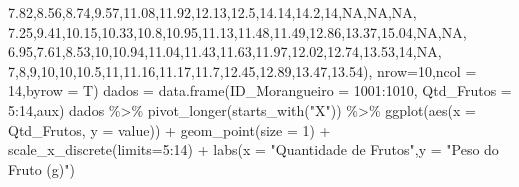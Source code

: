 \documentclass[
]{book}
\newenvironment{Shaded}{\begin{snugshade}}{\end{snugshade}}
\newcommand{\AttributeTok}[1]{\textcolor[rgb]{0.77,0.63,0.00}{#1}}
\newcommand{\ConstantTok}[1]{\textcolor[rgb]{0.00,0.00,0.00}{#1}}
\newcommand{\DecValTok}[1]{\textcolor[rgb]{0.00,0.00,0.81}{#1}}
\newcommand{\FloatTok}[1]{\textcolor[rgb]{0.00,0.00,0.81}{#1}}
\newcommand{\FunctionTok}[1]{\textcolor[rgb]{0.00,0.00,0.00}{#1}}
\newcommand{\NormalTok}[1]{#1}
\newcommand{\OtherTok}[1]{\textcolor[rgb]{0.56,0.35,0.01}{#1}}
\newcommand{\SpecialCharTok}[1]{\textcolor[rgb]{0.00,0.00,0.00}{#1}}
\newcommand{\StringTok}[1]{\textcolor[rgb]{0.31,0.60,0.02}{#1}}
\begin{document}
\begin{Shaded}
\begin{Highlighting}[]
               \FloatTok{7.82}\NormalTok{,}\FloatTok{8.56}\NormalTok{,}\FloatTok{8.74}\NormalTok{,}\FloatTok{9.57}\NormalTok{,}\FloatTok{11.08}\NormalTok{,}\FloatTok{11.92}\NormalTok{,}\FloatTok{12.13}\NormalTok{,}\FloatTok{12.5}\NormalTok{,}\FloatTok{14.14}\NormalTok{,}\FloatTok{14.2}\NormalTok{,}\DecValTok{14}\NormalTok{,}\ConstantTok{NA}\NormalTok{,}\ConstantTok{NA}\NormalTok{,}\ConstantTok{NA}\NormalTok{,}
               \FloatTok{7.25}\NormalTok{,}\FloatTok{9.41}\NormalTok{,}\FloatTok{10.15}\NormalTok{,}\FloatTok{10.33}\NormalTok{,}\FloatTok{10.8}\NormalTok{,}\FloatTok{10.95}\NormalTok{,}\FloatTok{11.13}\NormalTok{,}\FloatTok{11.48}\NormalTok{,}\FloatTok{11.49}\NormalTok{,}\FloatTok{12.86}\NormalTok{,}\FloatTok{13.37}\NormalTok{,}\FloatTok{15.04}\NormalTok{,}\ConstantTok{NA}\NormalTok{,}\ConstantTok{NA}\NormalTok{,}
               \FloatTok{6.95}\NormalTok{,}\FloatTok{7.61}\NormalTok{,}\FloatTok{8.53}\NormalTok{,}\DecValTok{10}\NormalTok{,}\FloatTok{10.94}\NormalTok{,}\FloatTok{11.04}\NormalTok{,}\FloatTok{11.43}\NormalTok{,}\FloatTok{11.63}\NormalTok{,}\FloatTok{11.97}\NormalTok{,}\FloatTok{12.02}\NormalTok{,}\FloatTok{12.74}\NormalTok{,}\FloatTok{13.53}\NormalTok{,}\DecValTok{14}\NormalTok{,}\ConstantTok{NA}\NormalTok{,}
               \DecValTok{7}\NormalTok{,}\DecValTok{8}\NormalTok{,}\DecValTok{9}\NormalTok{,}\DecValTok{10}\NormalTok{,}\DecValTok{10}\NormalTok{,}\FloatTok{10.5}\NormalTok{,}\DecValTok{11}\NormalTok{,}\FloatTok{11.16}\NormalTok{,}\FloatTok{11.17}\NormalTok{,}\FloatTok{11.7}\NormalTok{,}\FloatTok{12.45}\NormalTok{,}\FloatTok{12.89}\NormalTok{,}\FloatTok{13.47}\NormalTok{,}\FloatTok{13.54}\NormalTok{),}
             \AttributeTok{nrow=}\DecValTok{10}\NormalTok{,}\AttributeTok{ncol =} \DecValTok{14}\NormalTok{,}\AttributeTok{byrow =}\NormalTok{ T)}
\NormalTok{dados }\OtherTok{=} \FunctionTok{data.frame}\NormalTok{(}\AttributeTok{ID\_Morangueiro =} \DecValTok{1001}\SpecialCharTok{:}\DecValTok{1010}\NormalTok{,}
                   \AttributeTok{Qtd\_Frutos =} \DecValTok{5}\SpecialCharTok{:}\DecValTok{14}\NormalTok{,aux)}
\NormalTok{dados }\SpecialCharTok{\%\textgreater{}\%} 
  \FunctionTok{pivot\_longer}\NormalTok{(}\FunctionTok{starts\_with}\NormalTok{(}\StringTok{"X"}\NormalTok{)) }\SpecialCharTok{\%\textgreater{}\%} 
  \FunctionTok{ggplot}\NormalTok{(}\FunctionTok{aes}\NormalTok{(}\AttributeTok{x =}\NormalTok{ Qtd\_Frutos, }\AttributeTok{y =}\NormalTok{ value)) }\SpecialCharTok{+}
  \FunctionTok{geom\_point}\NormalTok{(}\AttributeTok{size =} \DecValTok{1}\NormalTok{) }\SpecialCharTok{+}
  \FunctionTok{scale\_x\_discrete}\NormalTok{(}\AttributeTok{limits=}\DecValTok{5}\SpecialCharTok{:}\DecValTok{14}\NormalTok{) }\SpecialCharTok{+}
  \FunctionTok{labs}\NormalTok{(}\AttributeTok{x =} \StringTok{"Quantidade de Frutos"}\NormalTok{,}\AttributeTok{y =} \StringTok{"Peso do Fruto (g)"}\NormalTok{)}
\end{Highlighting}
\end{Shaded}
\end{document}
